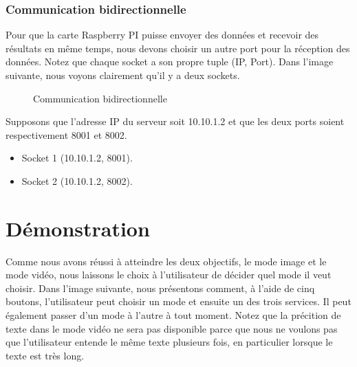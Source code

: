 {\subsection{Communication bidirectionnelle}
Pour que la carte Raspberry PI puisse envoyer des données et recevoir des résultats en même temps, nous devons choisir un autre port pour la réception des données. Notez que chaque socket a son propre tuple (IP, Port). Dans l'image suivante, nous voyons clairement qu'il y a deux sockets.
\begin{figure}[H] 
\centering
{}
\caption{Communication bidirectionnelle}
\label{fig:figure10}
\end{figure}

Supposons que l'adresse IP du serveur soit 10.10.1.2 et que les deux ports soient respectivement 8001 et 8002.
\begin{center}
    \begin{itemize}
        \item Socket 1 (10.10.1.2, 8001).
        \item Socket 2 (10.10.1.2, 8002).
    \end{itemize}
\end{center}




\pagebreak
{}
\chapter{Démonstration}\thispagestyle{fancy}

Comme nous avons réussi à atteindre les deux objectifs, le mode image et le mode vidéo, nous laissons le choix à l'utilisateur de décider quel mode il veut choisir. Dans l'image suivante, nous présentons comment, à l'aide de cinq boutons, l'utilisateur peut choisir un mode et ensuite un des trois services. Il peut également passer d'un mode à l'autre à tout moment. Notez que la précition de texte dans le mode vidéo ne sera pas disponible parce que nous ne voulons pas que l'utilisateur entende le même texte plusieurs fois, en particulier lorsque le texte est très long.

}
